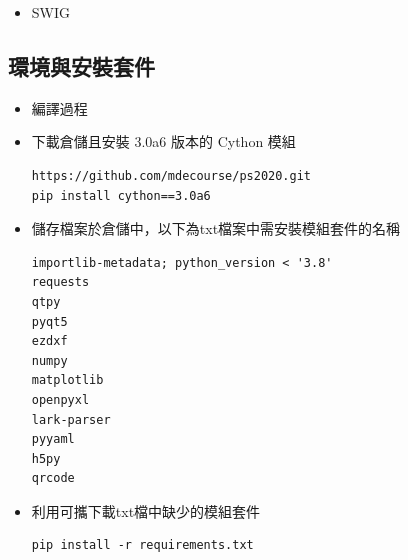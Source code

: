 \documentclass[14pt,a4paper]{report}  %
\newcommand{\fourteen}{\fontsize{14pt}{\baselineskip}\selectfont}%
\begin{document}
{\begin{itemize}
      	\newpage
		\item{SWIG}\\
      	\fourteen {可將C++/C、其他高階程式語言(如:Python)進行連結的介面，為C++/C語言撰寫由Python呼叫動態函式庫或轉換成Python語法的解析器。}      	
      	\end{itemize} 
      	     	
\subsection{環境與安裝套件}
		\begin{itemize}		
		\item{編譯過程}\\     
		\fourteen {下載已經建立開發環境的套件(如:Mysy2程式、python38、solvespace)的可攜kmol-project檔案，之後安裝3.0a6版本的Cython模組以便進行Pyslvs編譯，另外安裝環境缺少的套件(如: PyQt、Numpy)，完成開發環境的架構後下載ps2020檔案，進入ps2020中在Makefile中進行編譯，完成後進入ps2020中Pyslvs檔案夾安裝setup.py檔，此動作主要壓縮並包裝檔案於資料夾中，最後回到ps2020根目錄再次安裝下載setup.py為使整個環境、編譯動態連結庫封裝成Pyslvs.exe執行檔，最後只需打Pyslvs即可呼叫啟動位於資料夾中的Pyslvs.exe執行檔，出現在畫面中的頁面為編譯完成後的結果。} 

		\item 下載倉儲且安裝 3.0a6 版本的 Cython 模組
		\begin{lstlisting}[caption=下載倉儲安裝Cython]
https://github.com/mdecourse/ps2020.git
pip install cython==3.0a6
		\end{lstlisting}
		\end{itemize}

		\begin{itemize}
		\item 儲存檔案於倉儲中，以下為txt檔案中需安裝模組套件的名稱
		\begin{lstlisting}[caption=安裝模組套件]
importlib-metadata; python_version < '3.8'
requests
qtpy
pyqt5
ezdxf
numpy
matplotlib
openpyxl
lark-parser
pyyaml
h5py
qrcode
		\end{lstlisting}
		\end{itemize}
		
		\newpage
		\begin{itemize}
		\item 利用可攜下載txt檔中缺少的模組套件
		\begin{lstlisting}[caption=安裝模組套件指令]
pip install -r requirements.txt
		\end{lstlisting}
		\end{itemize}
		
}
\end{document}

